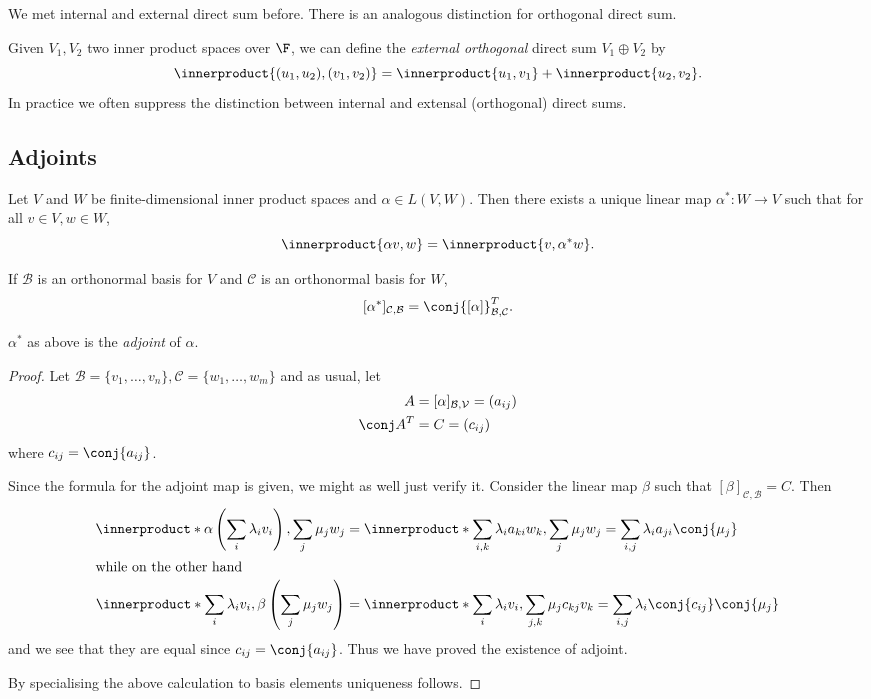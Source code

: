 \documentclass[a4paper]{article}
\newcommand*{\basis}{\mathcal}
\newcommand*{\ip}{\innerproduct}
\theoremstyle{definition}
\begin{document}
\begin{remark}
  We met internal and external direct sum before. There is an analogous distinction for orthogonal direct sum.

  Given \(V_1, V_2\) two inner product spaces over \(\F\), we can define the \emph{external orthogonal} direct sum \(V_1 \oplus V_2\) by
  \[
    \ip{(u_1, u_2), (v_1, v_2)} = \ip{u_1, v_1} + \ip{u_2, v_2}.
  \]
  In practice we often suppress the distinction between internal and extensal (orthogonal) direct sums.
\end{remark}

\subsection{Adjoints}

\begin{proposition}
  Let \(V\) and \(W\) be finite-dimensional inner product spaces and \(\alpha \in L(V, W)\). Then there exists a unique linear map \(\alpha^*: W \to V\) such that for all \(v \in V, w \in W\),
  \[
    \ip{\alpha v, w} = \ip{v, \alpha^*w}.
  \]

  If \(\basis B\) is an orthonormal basis for \(V\) and \(\basis C\) is an orthonormal basis for \(W\),
  \[
    [\alpha^*]_{\basis C, \basis B} = \conj{[\alpha]}^T_{\basis B, \basis C}.
  \]
\end{proposition}

\begin{definition}[Adjoint]
  \(\alpha^*\) as above is the \emph{adjoint} of \(\alpha\).
\end{definition}

\begin{proof}
  Let \(\basis B = \{v_1, \dots, v_n\}, \basis C = \{w_1, \dots, w_m\}\) and as usual, let
  \begin{align*}
    A &= [\alpha]_{\basis B, \basis V} = (a_{ij}) \\
    \conj A^T &= C = (c_{ij})
  \end{align*}
  where \(c_{ij} = \conj{a_{ij}}\).

  Since the formula for the adjoint map is given, we might as well just verify it. Consider the linear map \(\beta\) such that \([\beta]_{\basis C, \basis B} = C\). Then
  \begin{align*}
    \ip*{\alpha \left( \sum_i \lambda_iv_i \right), \sum_j \mu_jw_j} &= \ip*{\sum_{i, k}\lambda_ia_{ki}w_k, \sum_j \mu_jw_j} = \sum_{i, j} \lambda_ia_{ji}\conj{\mu_j} \\
    \intertext{while on the other hand}
    \ip*{\sum_i \lambda_iv_i, \beta \left( \sum_j \mu_jw_j \right)} &= \ip*{\sum_i\lambda_iv_i, \sum_{j, k}\mu_jc_{kj}v_k}  = \sum_{i, j}\lambda_i \conj{c_{ij}}\conj{\mu_j} \\
  \end{align*}
  and we see that they are equal since \(c_{ij} = \conj{a_{ij}}\). Thus we have proved the existence of adjoint.

  By specialising the above calculation to basis elements uniqueness follows.
\end{proof}
\end{document}
